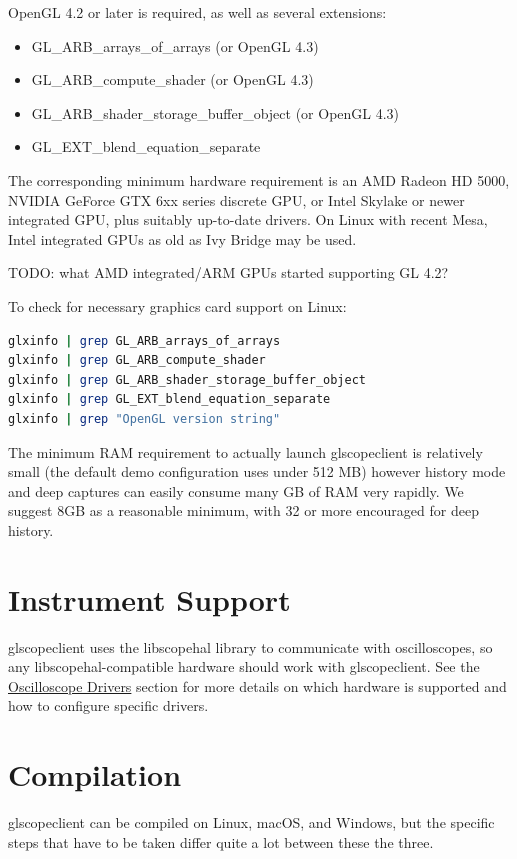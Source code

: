 OpenGL 4.2 or later is required, as well as several extensions:
\begin{itemize}
\item GL\_ARB\_arrays\_of\_arrays (or OpenGL 4.3)
\item GL\_ARB\_compute\_shader (or OpenGL 4.3)
\item GL\_ARB\_shader\_storage\_buffer\_object (or OpenGL 4.3)
\item GL\_EXT\_blend\_equation\_separate
\end{itemize}

The corresponding minimum hardware requirement is an AMD Radeon HD 5000, NVIDIA GeForce GTX 6xx series discrete GPU, or
Intel Skylake or newer integrated GPU, plus suitably up-to-date drivers. On Linux with recent Mesa, Intel integrated
GPUs as old as Ivy Bridge may be used.

TODO: what AMD integrated/ARM GPUs started supporting GL 4.2?

To check for necessary graphics card support on Linux:
\begin{lstlisting}[language=sh, numbers=none]
glxinfo | grep GL_ARB_arrays_of_arrays
glxinfo | grep GL_ARB_compute_shader
glxinfo | grep GL_ARB_shader_storage_buffer_object
glxinfo | grep GL_EXT_blend_equation_separate
glxinfo | grep "OpenGL version string"
\end{lstlisting}

The minimum RAM requirement to actually launch glscopeclient is relatively small (the default demo configuration uses
under 512 MB) however history mode and deep captures can easily consume many GB of RAM very rapidly. We suggest 8GB as
a reasonable minimum, with 32 or more encouraged for deep history.

\section{Instrument Support}

glscopeclient uses the libscopehal library to communicate with oscilloscopes, so any libscopehal-compatible hardware
should work with glscopeclient. See the \hyperref[sec:scope-drivers]{Oscilloscope Drivers} section for more details on which
hardware is supported and how to configure specific drivers.

\section{Compilation}

glscopeclient can be compiled on Linux, macOS, and Windows, but the specific steps that have to be taken differ quite a
lot between these the three.

